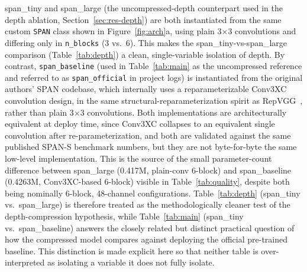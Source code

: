 \documentclass[11pt]{article}
\begin{document}
span\_tiny and span\_large (the uncompressed-depth counterpart used in the depth ablation, Section~\ref{sec:res-depth}) are both instantiated from the same custom \texttt{SPAN} class shown in Figure~\ref{fig:arch}a, using plain 3$\times$3 convolutions and differing only in \texttt{n\_blocks} (3 vs.\ 6). This makes the span\_tiny-vs-span\_large comparison (Table~\ref{tab:depth}) a clean, single-variable isolation of depth. By contrast, \texttt{span\_baseline} (used in Table~\ref{tab:main} as the uncompressed reference and referred to as \texttt{span\_official} in project logs) is instantiated from the original authors' SPAN codebase, which internally uses a reparameterizable Conv3XC convolution design, in the same structural-reparameterization spirit as RepVGG~\cite{ding2021repvgg}, rather than plain 3$\times$3 convolutions. Both implementations are architecturally equivalent at deploy time, since Conv3XC collapses to an equivalent single convolution after re-parameterization, and both are validated against the same published SPAN-S benchmark numbers, but they are not byte-for-byte the same low-level implementation. This is the source of the small parameter-count difference between span\_large (0.417M, plain-conv 6-block) and span\_baseline (0.4263M, Conv3XC-based 6-block) visible in Table~\ref{tab:quality}, despite both being nominally 6-block, 48-channel configurations. Table~\ref{tab:depth} (span\_tiny vs.\ span\_large) is therefore treated as the methodologically cleaner test of the depth-compression hypothesis, while Table~\ref{tab:main} (span\_tiny vs.\ span\_baseline) answers the closely related but distinct practical question of how the compressed model compares against deploying the official pre-trained baseline. This distinction is made explicit here so that neither table is over-interpreted as isolating a variable it does not fully isolate.
\end{document}
